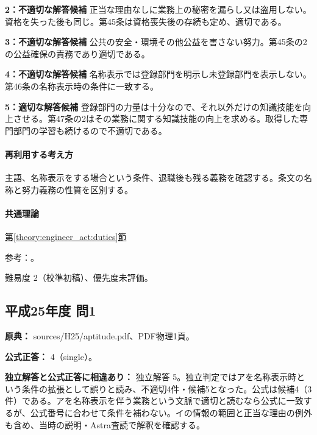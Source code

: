 \noindent\textbf{2：不適切な解答候補} 正当な理由なしに業務上の秘密を漏らし又は盗用しない。資格を失った後も同じ。第45条は資格喪失後の存続も定め、適切である。\par

\noindent\textbf{3：不適切な解答候補} 公共の安全・環境その他公益を害さない努力。第45条の2の公益確保の責務であり適切である。\par

\noindent\textbf{4：不適切な解答候補} 名称表示では登録部門を明示し未登録部門を表示しない。第46条の名称表示時の条件に一致する。\par

\noindent\textbf{5：適切な解答候補} 登録部門の力量は十分なので、それ以外だけの知識技能を向上させる。第47条の2はその業務に関する知識技能の向上を求める。取得した専門部門の学習も続けるので不適切である。\par

\paragraph{再利用する考え方} 主語、名称表示をする場合という条件、退職後も残る義務を確認する。条文の名称と努力義務の性質を区別する。

\paragraph{共通理論} \hyperref[theory:engineer_act:duties]{第\ref*{theory:engineer_act:duties}節}

\par 参考：\cite{engineer_act_current}。

\par 難易度 2（校準初稿）、優先度未評価。

\subsection{平成25年度 問1}
\label{q:h25-reg-apt-01}

\noindent\textbf{原典：} sources/H25/aptitude.pdf、PDF物理1頁。

\textbf{公式正答：} 4（single）。

\par\textbf{独立解答と公式正答に相違あり：} 独立解答 5。独立判定ではアを名称表示時という条件の拡張として誤りと読み、不適切4件・候補5となった。公式は候補4（3件）である。アを名称表示を伴う業務という文脈で適切と読むなら公式に一致するが、公式番号に合わせて条件を補わない。イの情報の範囲と正当な理由の例外も含め、当時の説明・Astra査読で解釈を確認する。

